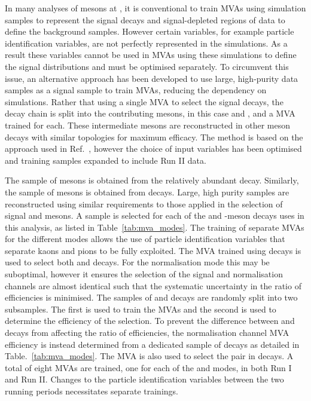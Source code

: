 In many analyses of \B mesons at \lhcb, it is conventional to train MVAs using simulation samples to represent the signal decays and signal-depleted regions of data to define the background samples. However certain variables, for example particle identification variables, are not perfectly represented in the \lhcb simulations. As a result these variables cannot be used in MVAs using these simulations to define the signal distributions and must be optimised separately.  
To circumvent this issue, an alternative approach has been developed to use large, high-purity data samples as a signal sample to train MVAs, reducing the dependency on simulations. Rather that using a single MVA to select the signal decays, the decay chain is split into the contributing mesons, in this case \Dsp and \phiz, and a MVA trained for each. These intermediate mesons are reconstructed in other \B meson decays with similar topologies for maximum efficacy.   
The method is based on the approach used in Ref.~\cite{LHCb-PAPER-2012-050}, however the choice of input variables has been optimised and training samples expanded to include Run II data.

The sample of \Dsp mesons is obtained from the relatively abundant \decay{\Bsb}{\Dsp\pim} decay. Similarly, the sample of \phiz mesons is obtained from \decay{\Bs}{\jpsi\phiz} decays. Large, high purity samples are reconstructed using similar requirements to those applied in the selection of signal \Dsp and \phiz mesons.
A sample is selected for each of the \Dsp and \phiz-meson decays uses in this analysis, as listed in Table~\ref{tab:mva_modes}. 
The training of separate MVAs for the different \Dsp modes allows the use of particle identification variables that separate kaons and pions to be fully exploited.
The MVA trained using \decay{\Bs}{\jpsi(\decay{\phiz}{\Kp\Km})} decays is used to select both \decay{\phiz}{\Kp}{\Km} and \decay{\Dzb}{\Kp\Km} decays. For the normalisation mode this may be suboptimal, however it ensures the selection of the signal and normalisation channels are almost identical such that the systematic uncertainty in the ratio of efficiencies is minimised.
The samples of \decay{\Bsb}{\Dsp\pim} and \decay{\Bs}{\jpsi\phiz} decays are randomly split into two subsamples. The first is used to train the MVAs and the second is used to determine the efficiency of the selection. To prevent the difference between \phiz and \Dzb decays from affecting the ratio of efficiencies, the normalisation channel MVA efficiency is instead determined from a dedicated sample of \decay{\Dzb}{\Kp\Km} decays as detailed in Table.~\ref{tab:mva_modes}. The \decay{\phiz}{\Kp\Km} MVA is also used to select the \Kp\Km pair in \decay{\Bp}{\Dsp\Kp\Km} decays.
A total of eight MVAs are trained, one for each of the \Dsp and \phiz modes, in both Run I and Run II. Changes to the particle identification variables between the two running periods necessitates separate trainings. 



